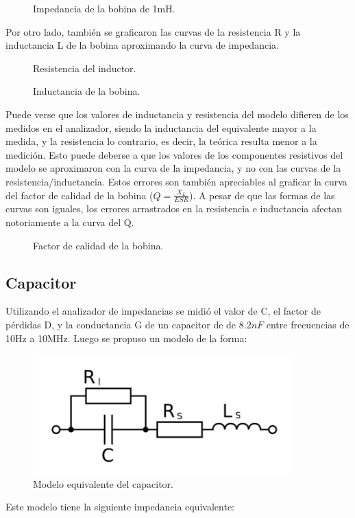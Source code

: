 \begin{figure}[h!]
\centering
\caption{Impedancia de la bobina de 1mH.}
\label{fig:bodeL}
\end{figure}

Por otro lado, también se graficaron las curvas de la resistencia R y la inductancia L de la bobina aproximando la curva de impedancia.

\begin{figure}[h!]
\centering
\caption{Resistencia del inductor.}
\label{fig:RdelL}
\end{figure}

\begin{figure}[h!]
\centering
\caption{Inductancia de la bobina.}
\label{fig:LdelL}
\end{figure}

Puede verse que los valores de inductancia y resistencia del modelo difieren de los medidos en el analizador, siendo la inductancia del equivalente mayor a la medida, y la resistencia lo contrario, es decir, la teórica resulta menor a la medición.  Esto puede deberse a que los valores de los componentes resistivos del modelo se aproximaron con la curva de la impedancia, y no con las curvas de la resistencia/inductancia.
Estos errores son también apreciables al graficar la curva del factor de calidad de la bobina ($Q=\frac{X_L}{ESR}$). A pesar de que las formas de las curvas son iguales, los errores arrastrados en la resistencia e inductancia afectan notoriamente a la curva del Q.

\begin{figure}[h!]
\centering
\caption{Factor de calidad de la bobina.}
\label{fig:QdelL}
\end{figure}

\subsection{Capacitor}

Utilizando el analizador de impedancias se midió el valor de C, el factor de pérdidas D, y la conductancia G de un capacitor de de $8.2nF$ entre frecuencias de 10Hz a 10MHz. Luego se propuso un modelo de la forma:

\begin{figure}[h!]
\centering
\includegraphics[scale=0.5]{modeloC.png}
\caption{Modelo equivalente del capacitor.}
\label{fig:modeloC}
\end{figure}
Este modelo tiene la siguiente impedancia equivalente:

